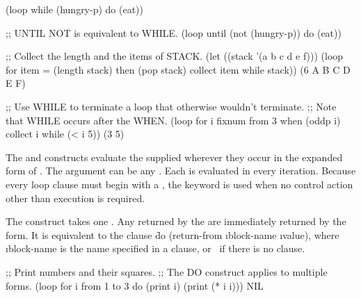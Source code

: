 \code
 (loop while (hungry-p) do (eat))
 
;; UNTIL NOT is equivalent to WHILE.
 (loop until (not (hungry-p)) do (eat))
 
;; Collect the length and the items of STACK.
 (let ((stack '(a b c d e f)))
   (loop for item = (length stack) then (pop stack)
         collect item
         while stack))
\EV (6 A B C D E F)
 
;; Use WHILE to terminate a loop that otherwise wouldn't terminate.
;; Note that WHILE occurs after the WHEN.
 (loop for i fixnum from 3
       when (oddp i) collect i
       while (< i 5))
\EV (3 5)
\endcode

\endsubsubsection%

\endsubsection%

 
The  and  constructs 
evaluate the 
supplied  
wherever they occur in the expanded form of .
 The  argument can be any .
Each  is evaluated in every iteration.
Because every loop clause must begin with a , 
the keyword  is used when no control action other than execution is 
required.
 
 The  construct takes one . 
 Any  returned by the  
 are immediately returned by the  form.
  It is equivalent to the clause
  \f{do (return-from \i{block-name} \i{value})},
  where \i{block-name} is the name specified in a 
  clause, or \nil\ if there is no  clause.
 

\code
;; Print numbers and their squares.
;; The DO construct applies to multiple forms.
 (loop for i from 1 to 3
       do (print i)
          (print (* i i)))
\EV NIL

\endcode

\endsubsubsection%

